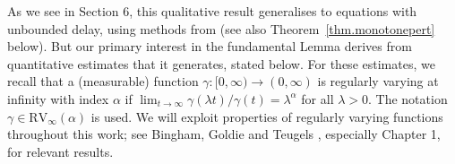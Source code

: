 \documentclass[a4paper,10pt,reqno]{amsart}
\numberwithin{equation}{section}
\newtheorem{theorem}{Theorem}
\theoremstyle{definition}
\theoremstyle{remark}
\DeclareMathOperator{\1}{\mathbbm 1}
\begin{document}
	As we see in Section 6, this qualitative result generalises  to equations with unbounded delay, using methods from \cite{AppBuck10} (see also  Theorem~\ref{thm.monotonepert} below). But our primary interest in the fundamental Lemma derives from quantitative estimates that it generates, stated below. For these estimates, we recall that a (measurable) function $\gamma:[0,\infty)\to (0,\infty)$ is regularly varying at infinity with index $\alpha$ if $\lim_{t\to\infty} \gamma(\lambda t)/\gamma(t)=\lambda^\alpha$ for all $\lambda>0$. The notation $\gamma\in \text{RV}_\infty(\alpha)$ is used. We will exploit properties of regularly varying functions throughout this work; see Bingham, Goldie and Teugels \cite{BGT}, especially Chapter 1, for relevant results.    
\end{document}
